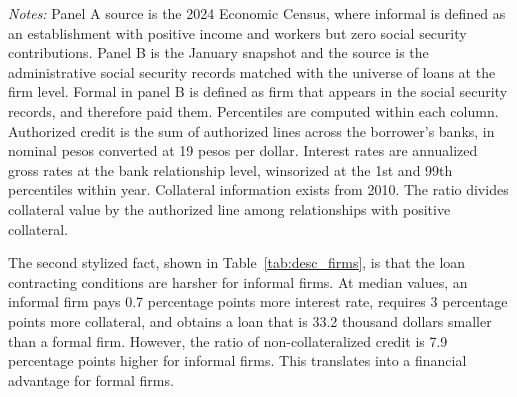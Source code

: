 \documentclass[12pt]{article}
\begin{document}
\begin{table}[H]
\begin{threeparttable}
\begin{tablenotes}[flushleft]
            \item \footnotesize \textit{Notes:} Panel A source is the 2024 Economic Census, where informal is defined as an establishment with positive income and workers but zero social security contributions. Panel B  is the January snapshot and the source is the administrative social security records matched with the universe of loans at the firm level. Formal in panel B is defined as firm that appears in the social security records, and therefore paid them. Percentiles are computed within each column. Authorized credit is the sum of authorized lines across the borrower's banks, in nominal pesos converted at 19 pesos per dollar. Interest rates are annualized gross rates at the bank relationship level, winsorized at the 1st and 99th percentiles within year. Collateral information exists from 2010. The ratio divides collateral value by the authorized line among relationships with positive collateral. %
        \end{tablenotes}
    \end{threeparttable}
\end{table}

The second stylized fact, shown in Table~\ref{tab:desc_firms}, is that the loan contracting conditions are harsher for informal firms. At median values, an informal firm pays 0.7 percentage points more interest rate, requires 3 percentage points more collateral, and obtains a loan that is 33.2 thousand dollars smaller than a formal firm. However, the ratio of non-collateralized credit is 7.9 percentage points higher for informal firms. This translates into a financial advantage for formal firms.
\end{document}
